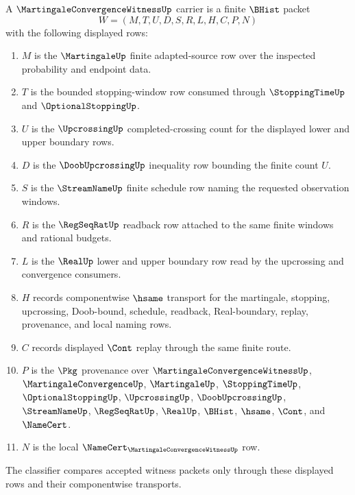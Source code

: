 \begin{definition}
\label{def:martingale-convergence-witness-carrier}
A $\MartingaleConvergenceWitnessUp$ carrier is a finite $\BHist$ packet
$$
W=(M,T,U,D,S,R,L,H,C,P,N)
$$
with the following displayed rows:
\begin{enumerate}
\item $M$ is the $\MartingaleUp$ finite adapted-source row over the inspected probability and endpoint data.
\item $T$ is the bounded stopping-window row consumed through $\StoppingTimeUp$ and $\OptionalStoppingUp$.
\item $U$ is the $\UpcrossingUp$ completed-crossing count for the displayed lower and upper boundary rows.
\item $D$ is the $\DoobUpcrossingUp$ inequality row bounding the finite count $U$.
\item $S$ is the $\StreamNameUp$ finite schedule row naming the requested observation windows.
\item $R$ is the $\RegSeqRatUp$ readback row attached to the same finite windows and rational budgets.
\item $L$ is the $\RealUp$ lower and upper boundary row read by the upcrossing and convergence consumers.
\item $H$ records componentwise $\hsame$ transport for the martingale, stopping, upcrossing, Doob-bound, schedule, readback, Real-boundary, replay, provenance, and local naming rows.
\item $C$ records displayed $\Cont$ replay through the same finite route.
\item $P$ is the $\Pkg$ provenance over $\MartingaleConvergenceWitnessUp$, $\MartingaleConvergenceUp$, $\MartingaleUp$, $\StoppingTimeUp$, $\OptionalStoppingUp$, $\UpcrossingUp$, $\DoobUpcrossingUp$, $\StreamNameUp$, $\RegSeqRatUp$, $\RealUp$, $\BHist$, $\hsame$, $\Cont$, and $\NameCert$.
\item $N$ is the local $\NameCert_{\MartingaleConvergenceWitnessUp}$ row.
\end{enumerate}
The classifier compares accepted witness packets only through these displayed rows and their componentwise transports.
\end{definition}

